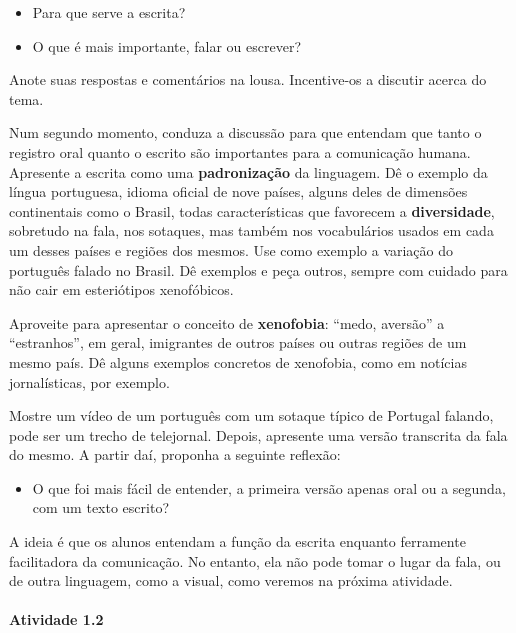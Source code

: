 \documentclass[11pt]{extarticle}
\begin{document}
\begin{itemize}
\item Para que serve a escrita?
\item O que é mais importante, falar ou escrever? 
\end{itemize}

Anote suas respostas e comentários na lousa. Incentive-os a discutir acerca do tema. 

Num segundo momento, conduza a discussão para que entendam que tanto o registro oral 
quanto o escrito são importantes para a comunicação humana. Apresente a escrita
como uma \textbf{padronização} da linguagem. Dê o exemplo da língua portuguesa,
idioma oficial de nove países, alguns deles de dimensões continentais como o Brasil,
todas características que favorecem a \textbf{diversidade}, sobretudo na fala,
nos sotaques, mas também nos vocabulários usados em cada um desses países e regiões
dos mesmos. Use como exemplo a variação do português falado no Brasil.
Dê exemplos e peça outros, sempre com cuidado para não cair em esteriótipos xenofóbicos. 

Aproveite para apresentar o conceito de \textbf{xenofobia}: ``medo, aversão'' a ``estranhos'', em geral, imigrantes
de outros países ou outras regiões de um mesmo país. Dê alguns exemplos concretos de 
xenofobia, como em notícias jornalísticas, por exemplo. 

Mostre um vídeo de um português com um sotaque típico de Portugal falando, pode ser um trecho de 
telejornal. Depois, apresente uma versão transcrita da fala do mesmo. 
A partir daí, proponha a seguinte reflexão:

\begin{itemize}
\item O que foi mais fácil de entender, a primeira versão apenas oral ou a segunda,
com um texto escrito? 
\end{itemize}

A ideia é que os alunos entendam a função da escrita enquanto ferramente facilitadora
da comunicação. No entanto, ela não pode tomar o lugar da fala, ou de outra linguagem,
como a visual, como veremos na próxima atividade.

\paragraph{Atividade 1.2}
\end{document}
